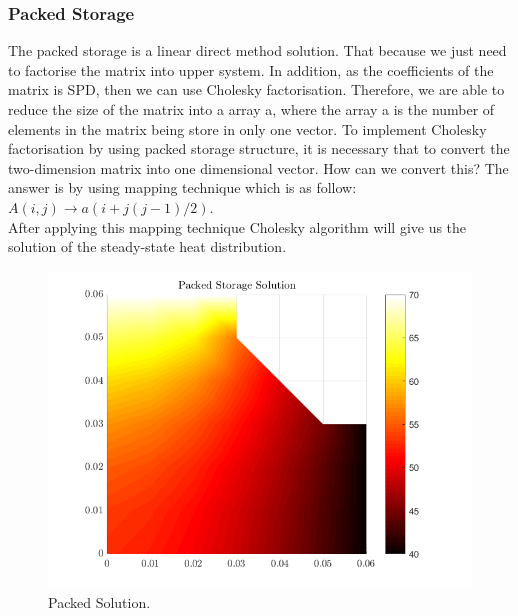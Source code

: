 \documentclass[12pt,a4paper]{article}
\begin{document}
\subsubsection{Packed Storage}
The packed storage is a linear direct method solution. That because we just need to factorise the matrix into upper system. In addition, as the coefficients of the matrix is SPD, then we can use Cholesky factorisation. Therefore, we are able to reduce the size of the matrix into a array a, where the array a is the number of elements in the matrix being store in only one vector. To implement Cholesky factorisation by using packed storage structure, it is necessary that to convert the two-dimension matrix into one dimensional vector. How can we convert this? The answer is by using mapping technique which is as follow:
\\
$A(i,j) \to a(i+j(j-1)/2)$. 
\\
After applying this mapping technique Cholesky algorithm will give us the solution of the steady-state heat distribution.
\begin{figure}[H]
	\includegraphics[width=\linewidth]{images/packedsolution.png}
	\caption{Packed Solution.}
	\label{fig:packed}
\end{figure}
\end{document}
